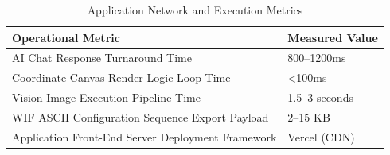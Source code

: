 \begin{table}[H]
\centering
\caption{Application Network and Execution Metrics}
\begin{tabular}{|l|l|}
\hline
\textbf{Operational Metric} & \textbf{Measured Value} \\
\hline
AI Chat Response Turnaround Time & 800–1200ms \\
\hline
Coordinate Canvas Render Logic Loop Time & <100ms \\
\hline
Vision Image Execution Pipeline Time & 1.5–3 seconds \\
\hline
WIF ASCII Configuration Sequence Export Payload & 2–15 KB \\
\hline
Application Front-End Server Deployment Framework & Vercel (CDN) \\
\hline
\end{tabular}
\label{tab:api_performance}
\end{table}

